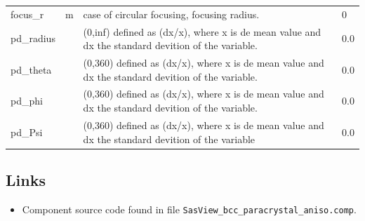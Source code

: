 \begin{longtable}{p{}p{}p{}p{}}
focus\_r & m & case of circular focusing, focusing radius. & 0 \\
pd\_radius &  & (0,inf) defined as (dx/x), where x is de mean value and dx the standard devition of the variable. & 0.0 \\
pd\_theta &  & (0,360) defined as (dx/x), where x is de mean value and dx the standard devition of the variable. & 0.0 \\
pd\_phi &  & (0,360) defined as (dx/x), where x is de mean value and dx the standard devition of the variable. & 0.0 \\
pd\_Psi &  & (0,360) defined as (dx/x), where x is de mean value and dx the standard devition of the variable & 0.0 \\
\bottomrule
\end{longtable}

\subsection*{Links}
\begin{itemize}
  \item Component source code found in file \texttt{SasView\_bcc\_paracrystal\_aniso.comp}.
\end{itemize}
